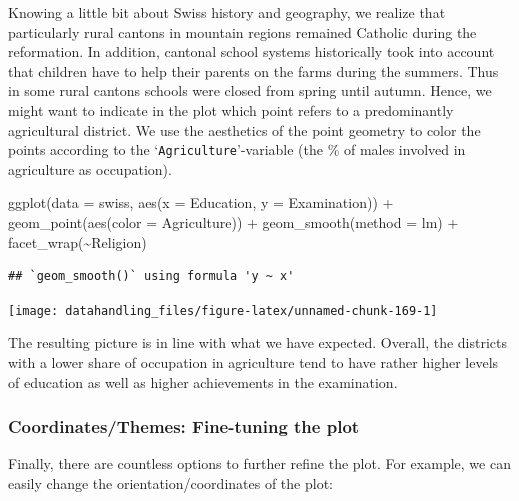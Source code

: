 \documentclass[
  12pt,
]{style/krantz}
\newenvironment{Shaded}{\begin{snugshade}}{\end{snugshade}}
\newcommand{\AttributeTok}[1]{\textcolor[rgb]{0.77,0.63,0.00}{#1}}
\newcommand{\FunctionTok}[1]{\textcolor[rgb]{0.00,0.00,0.00}{#1}}
\newcommand{\NormalTok}[1]{#1}
\newcommand{\SpecialCharTok}[1]{\textcolor[rgb]{0.00,0.00,0.00}{#1}}
\newcommand{\StringTok}[1]{\textcolor[rgb]{0.31,0.60,0.02}{#1}}
\begin{document}
Knowing a little bit about Swiss history and geography, we realize that particularly rural cantons in mountain regions remained Catholic during the reformation. In addition, cantonal school systems historically took into account that children have to help their parents on the farms during the summers. Thus in some rural cantons schools were closed from spring until autumn. Hence, we might want to indicate in the plot which point refers to a predominantly agricultural district. We use the aesthetics of the point geometry to color the points according to the `\texttt{Agriculture}'-variable (the \% of males involved in agriculture as occupation).

\begin{Shaded}
\begin{Highlighting}[]
\FunctionTok{ggplot}\NormalTok{(}\AttributeTok{data =}\NormalTok{ swiss, }\FunctionTok{aes}\NormalTok{(}\AttributeTok{x =}\NormalTok{ Education, }\AttributeTok{y =}\NormalTok{ Examination)) }\SpecialCharTok{+} 
     \FunctionTok{geom\_point}\NormalTok{(}\FunctionTok{aes}\NormalTok{(}\AttributeTok{color =}\NormalTok{ Agriculture)) }\SpecialCharTok{+}
     \FunctionTok{geom\_smooth}\NormalTok{(}\AttributeTok{method =} \StringTok{\textquotesingle{}lm\textquotesingle{}}\NormalTok{) }\SpecialCharTok{+}
     \FunctionTok{facet\_wrap}\NormalTok{(}\SpecialCharTok{\textasciitilde{}}\NormalTok{Religion)}
\end{Highlighting}
\end{Shaded}

\begin{verbatim}
## `geom_smooth()` using formula 'y ~ x'
\end{verbatim}

\texttt{[image: datahandling\_files/figure-latex/unnamed-chunk-169-1]}

The resulting picture is in line with what we have expected. Overall, the districts with a lower share of occupation in agriculture tend to have rather higher levels of education as well as higher achievements in the examination.

\hypertarget{coordinatesthemes-fine-tuning-the-plot}{%
\subsubsection{Coordinates/Themes: Fine-tuning the plot}\label{coordinatesthemes-fine-tuning-the-plot}}

Finally, there are countless options to further refine the plot. For example, we can easily change the orientation/coordinates of the plot:
\end{document}
